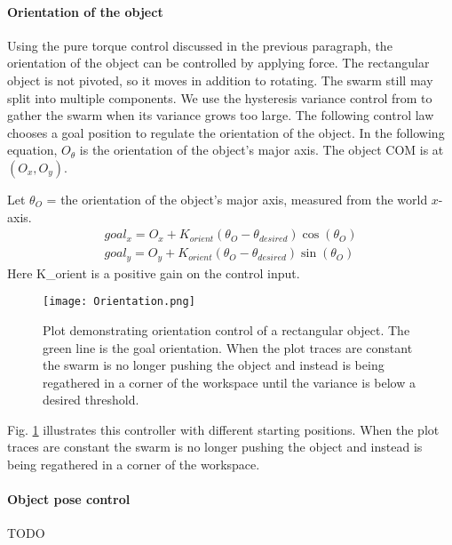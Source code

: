 \paragraph{Orientation of the object}
Using the pure torque control discussed in the previous paragraph, the orientation of the object can be controlled by applying force. 
The rectangular object is not pivoted, so it moves in addition to rotating. 
 The swarm still may split into multiple components.
  We use the hysteresis variance control from \cite{ShahrokhiIROS2015}  to gather the swarm when its variance grows too large. 
  The following control law chooses a goal position to regulate the orientation of the object.  In the following equation, $O_{\theta}$ is the orientation of the object's major axis. The object COM is at $(O_x,O_y)$.

Let $\theta_O$ = the orientation of the object's major axis, measured from the world $x$-axis.
\begin{align}\nonumber
goal_x = O_x +  K_{orient}  ( \theta_O - \theta_{desired} ) \cos(\theta_O) \\
goal_y = O_y +  K_{orient}  ( \theta_O - \theta_{desired} ) \sin(\theta_O)
\end{align}
Here K_{orient} is a positive gain on the control input.  

\begin{figure}
\begin{center}
	\texttt{[image: Orientation.png]}
\end{center}
\vspace{-1em}
\caption{\label{fig:OrientCont}
Plot demonstrating  orientation control of a rectangular object. The green line is the goal orientation.   When the plot traces are constant the swarm is no longer pushing the object and instead is being regathered in a corner of the workspace until the variance is below a desired threshold. 
}
\vspace{-1em}
\end{figure}

Fig. \ref{fig:OrientCont} illustrates this controller with different starting positions. When the plot traces are constant the swarm is no longer pushing the object and instead is being regathered in a corner of the workspace. 

\paragraph{Object pose control}

TODO



